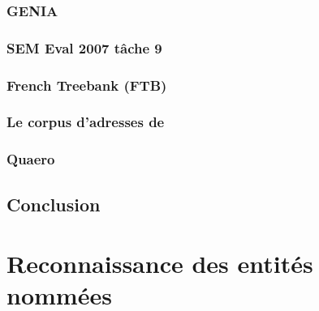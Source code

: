 \documentclass[12pt,a4paper,times,twoside,openright]{report}
\begin{document}
        \subsection{GENIA}
        \label{subsec:corpus-Genia}
        
        
        \subsection{SEM Eval 2007 tâche 9}
        \label{subsec:corpus-semeval2007}
        
        
        \subsection{French Treebank (FTB)}
        \label{subsec:corpus-FTB}
        
        
        \subsection{Le corpus d'adresses de \citet{yu2007high}}
        \label{subsec:corpus-addresses}
        
        
        \subsection{Quaero}
        \label{subsec:corpus-quaero}
        
        
    
    \section{Conclusion}
    \label{sec:corpus-conclusion}
    

\chapter{Reconnaissance des entités nommées}
\label{chap:NER}
\minitoc
    
    
    
\end{document}
